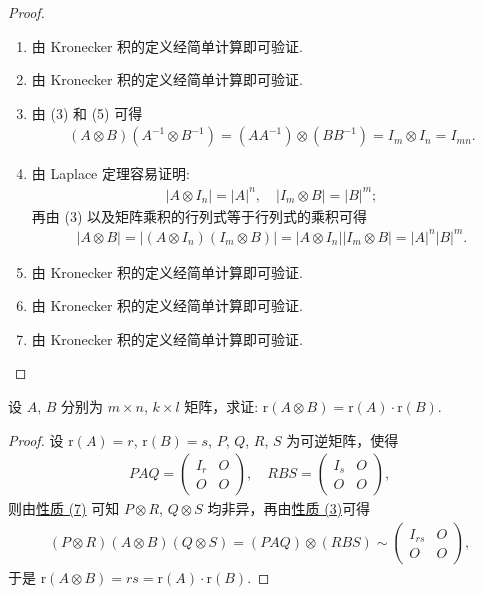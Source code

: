\documentclass[../../main.tex]{subfiles}
\begin{document}
\begin{proof}
\begin{enumerate}[(1)]
\item 由 Kronecker 积的定义经简单计算即可验证.

\item 由 Kronecker 积的定义经简单计算即可验证.

\item 由 (3) 和 (5) 可得
\begin{align*}
(A\otimes B)(A^{-1}\otimes B^{-1})=(AA^{-1})\otimes (BB^{-1})=I_m\otimes I_n = I_{mn}.
\end{align*}

\item 由 Laplace 定理容易证明:
\begin{align*}
|A\otimes I_n| = |A|^n, \quad |I_m\otimes B| = |B|^m;
\end{align*}
再由 (3) 以及矩阵乘积的行列式等于行列式的乘积可得
\begin{align*}
|A\otimes B| = |(A\otimes I_n)(I_m\otimes B)| = |A\otimes I_n||I_m\otimes B| = |A|^n|B|^m. 
\end{align*}

\item 由 Kronecker 积的定义经简单计算即可验证.

\item 由 Kronecker 积的定义经简单计算即可验证.

\item 由 Kronecker 积的定义经简单计算即可验证.
\end{enumerate}

\end{proof}

\begin{proposition}[矩阵的Kronecker积的秩]\label{proposition:矩阵的Kronecker积的秩}
设 $A$, $B$ 分别为 $m\times n$, $k\times l$ 矩阵，求证: $\mathrm{r}(A\otimes B)=\mathrm{r}(A)\cdot\mathrm{r}(B)$.
\end{proposition}
\begin{proof}
设 $\mathrm{r}(A)=r$, $\mathrm{r}(B)=s$, $P$, $Q$, $R$, $S$ 为可逆矩阵，使得
\begin{align*}
PAQ = \begin{pmatrix}
I_r & O \\
O & O
\end{pmatrix}, \quad RBS = \begin{pmatrix}
I_s & O \\
O & O
\end{pmatrix},
\end{align*}
则由\hyperref[矩阵的Kronecker积的基本性质(7)]{性质 (7)} 可知 $P\otimes R$, $Q\otimes S$ 均非异，再由\hyperref[矩阵的Kronecker积的基本性质(3)]{性质 (3)}可得
\begin{align*}
(P\otimes R)(A\otimes B)(Q\otimes S)=(PAQ)\otimes (RBS)\sim\begin{pmatrix}
I_{rs} & O \\
O & O
\end{pmatrix},
\end{align*}
于是 $\mathrm{r}(A\otimes B)=rs=\mathrm{r}(A)\cdot\mathrm{r}(B)$.  

\end{proof}
\end{document}
